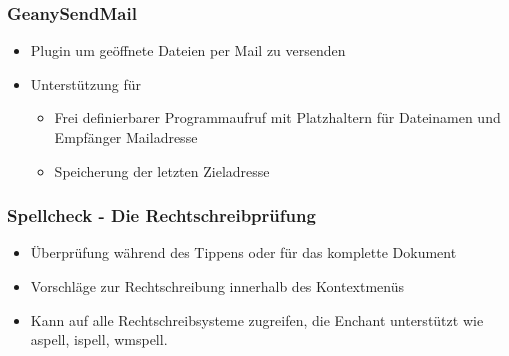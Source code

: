 \begin{frame}
  \frametitle{GeanySendMail}
  \begin{itemize}
  \item Plugin um geöffnete Dateien per Mail zu versenden
  \item Unterstützung für
    \begin{itemize}
    \item Frei definierbarer Programmaufruf mit Platzhaltern für
      Dateinamen und Empfänger Mailadresse
    \item Speicherung der letzten Zieladresse
    \end{itemize}
  \end{itemize}
\end{frame}

\begin{frame}
  \frametitle{Spellcheck - Die Rechtschreibprüfung}
  \begin{block}{}
    \begin{itemize}
    \item Überprüfung während des Tippens oder für das komplette
      Dokument
    \item Vorschläge zur Rechtschreibung innerhalb des Kontextmenüs
    \item Kann auf alle Rechtschreibsysteme zugreifen, die Enchant
      unterstützt wie aspell, ispell, wmspell.
    \end{itemize}
  \end{block}
\end{frame}
